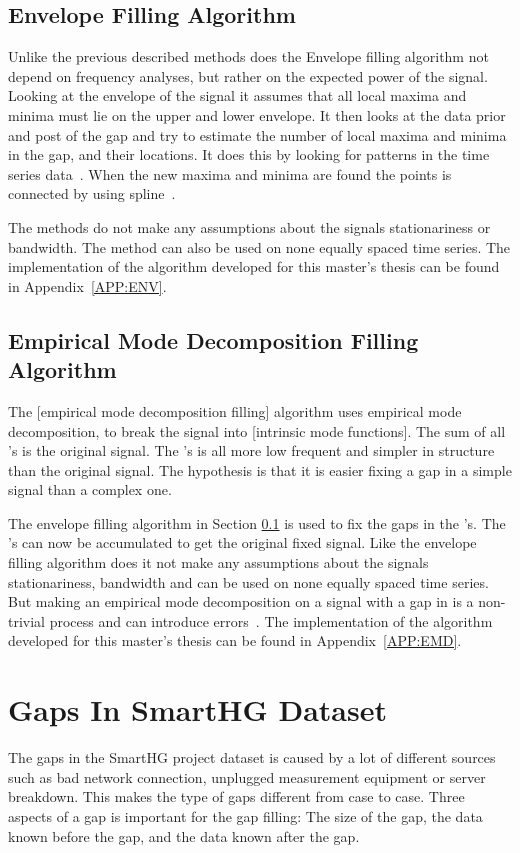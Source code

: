 \subsection{Envelope Filling Algorithm}
\label{T:EGA}
Unlike the previous described methods does the Envelope filling algorithm not depend on frequency analyses, but rather on the expected power of the signal. Looking at the envelope of the signal it assumes that all local maxima and minima must lie on the  upper and lower envelope. It then looks at the data prior and post of the gap and try to estimate the number of local maxima and minima in the gap, and their locations. It does this by looking for patterns in the time series data~\citep{RefWorks:6}. When the new maxima and minima are found the points is connected by using spline~\cite{RefWorks:16}. 

The methods do not make any assumptions about the signals stationariness or bandwidth. The method can also be used on none equally spaced time series. The implementation of the algorithm developed for this master's thesis can be found in Appendix~\ref{APP:ENV}.

\subsection{Empirical Mode Decomposition Filling Algorithm}
The [empirical mode decomposition filling] algorithm uses empirical mode decomposition, to break the signal into [intrinsic mode functions]. The sum of all 's is the original signal. The 's is all more low frequent and simpler in structure than the original signal. The hypothesis is that it is easier fixing a gap in a simple signal than a complex one. 

The envelope filling algorithm in Section \ref{T:EGA} is used to fix the gaps in the 's. The 's can now be accumulated to get the original fixed signal. Like the envelope filling algorithm does it not make any assumptions about the signals stationariness, bandwidth and can be used on none equally spaced time series. But making an empirical mode decomposition on a signal with a gap in is a non-trivial process and can introduce errors~\citep{RefWorks:16}. The implementation of the algorithm developed for this master's thesis can be found in Appendix~\ref{APP:EMD}.

\section{Gaps In SmartHG Dataset}
The gaps in the SmartHG project dataset is caused by a lot of different sources such as bad network connection, unplugged measurement equipment or server breakdown. This makes the type of gaps different from case to case. Three aspects of a gap is important for the gap filling: The size of the gap, the data known before the gap, and the data known after the gap. 


